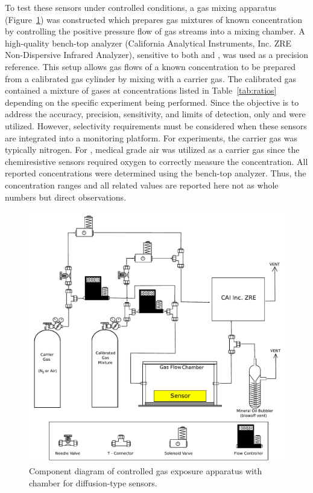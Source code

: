 \documentclass[sensors,article,submit,moreauthors,pdftex]{Definitions/mdpi}
\begin{document}
			To test these sensors under controlled conditions, a gas mixing apparatus (Figure~\ref{fig:exposureapparatus}) was constructed which prepares gas mixtures of known concentration by controlling the positive pressure flow of gas streams into a mixing chamber.
			A high-quality bench-top analyzer (California Analytical Instruments, Inc. ZRE Non-Dispersive Infrared Analyzer), sensitive to both  and , was used as a precision reference.
			This setup allows gas flows of a known concentration to be prepared from a calibrated gas cylinder by mixing with a carrier gas.
			The calibrated gas contained a mixture of gases at concentrations listed in Table~\ref{tab:ratios} depending on the specific experiment being performed.
			Since the objective is to address the accuracy, precision, sensitivity, and limits of detection, only  and  were utilized.
			However, selectivity requirements must be considered when these sensors are integrated into a monitoring platform.
			For  experiments, the carrier gas was typically nitrogen.
			For , medical grade air was utilized as a carrier gas since the chemiresistive sensors required oxygen to correctly measure the  concentration.
			All reported concentrations were determined using the bench-top analyzer.
			Thus, the concentration ranges and all related values are reported here not as whole numbers but direct observations.
			
			\begin{figure}[!t]
				\centering
				\includegraphics[width=\columnwidth]{honey1.pdf}
				\caption{Component diagram of controlled gas exposure apparatus with chamber for diffusion-type sensors.}
				\label{fig:exposureapparatus}
			\end{figure}
				
\end{document}
